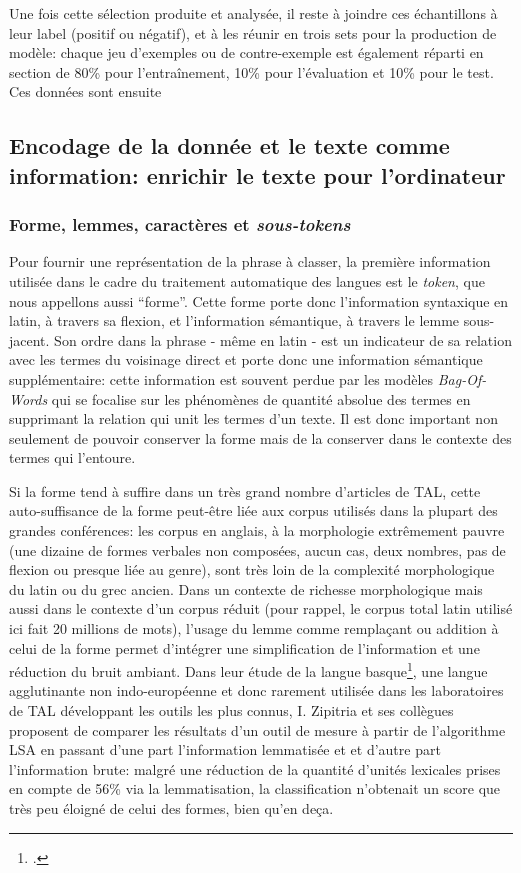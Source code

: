 Une fois cette sélection produite et analysée, il reste à joindre ces échantillons à leur label (positif ou négatif), et à les réunir en trois sets pour la production de modèle: chaque jeu d'exemples ou de contre-exemple est également réparti en section de 80\% pour l'entraînement, 10\% pour l'évaluation et 10\% pour le test. Ces données sont ensuite %

\subsection{Encodage de la donnée et le texte comme information: enrichir le texte pour l’ordinateur}


\subsubsection{Forme, lemmes, caractères et \textit{sous-tokens}}

Pour fournir une représentation de la phrase à classer, la première information utilisée dans le cadre du traitement automatique des langues est le \textit{token}, que nous appellons aussi \enquote{forme}. Cette forme porte donc l'information syntaxique en latin, à travers sa flexion, et l'information sémantique, à travers le lemme sous-jacent. Son ordre dans la phrase - même en latin - %
est un indicateur de sa relation avec les termes du voisinage direct et porte donc une information sémantique supplémentaire: cette information est souvent perdue par les modèles \textit{Bag-Of-Words} qui se focalise sur les phénomènes de quantité absolue des termes en supprimant la relation qui unit les termes d'un texte. Il est donc important non seulement de pouvoir conserver la forme mais de la conserver dans le contexte des termes qui l'entoure. 

Si la forme tend à suffire dans un très grand nombre d'articles de TAL, cette auto-suffisance de la forme peut-être liée aux corpus utilisés dans la plupart des grandes conférences: les corpus en anglais, à la morphologie extrêmement pauvre (une dizaine de formes verbales non composées, aucun cas, deux nombres, pas de flexion ou presque liée au genre), sont très loin de la complexité morphologique du latin ou du grec ancien. Dans un contexte de richesse morphologique mais aussi dans le contexte d'un corpus réduit (pour rappel, le corpus total latin utilisé ici fait 20 millions de mots), l'usage du lemme comme remplaçant ou addition à celui de la forme permet d'intégrer une simplification de l'information et une réduction du bruit ambiant. Dans leur étude de la langue basque\footcite{zipitria_observing_2006}, une langue agglutinante non indo-européenne et donc rarement utilisée dans les laboratoires de TAL développant les outils les plus connus, I. Zipitria et ses collègues proposent de comparer les résultats d'un outil de mesure à partir de l'algorithme LSA en passant d'une part l'information lemmatisée et et d'autre part l'information brute: malgré une réduction de la quantité d'unités lexicales prises en compte de 56\% via la lemmatisation, la classification n'obtenait un score que très peu éloigné de celui des formes, bien qu'en deça. 

